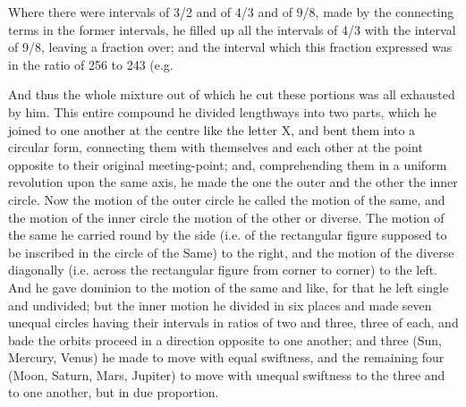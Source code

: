 \documentclass[11pt,letter]{article}
\begin{document}
\par  Where there were intervals of 3/2 and of 4/3 and of 9/8, made by the connecting terms in the former intervals, he filled up all the intervals of 4/3 with the interval of 9/8, leaving a fraction over; and the interval which this fraction expressed was in the ratio of 256 to 243 (e.g.
 
\par  And thus the whole mixture out of which he cut these portions was all exhausted by him. This entire compound he divided lengthways into two parts, which he joined to one another at the centre like the letter X, and bent them into a circular form, connecting them with themselves and each other at the point opposite to their original meeting-point; and, comprehending them in a uniform revolution upon the same axis, he made the one the outer and the other the inner circle. Now the motion of the outer circle he called the motion of the same, and the motion of the inner circle the motion of the other or diverse. The motion of the same he carried round by the side (i.e. of the rectangular figure supposed to be inscribed in the circle of the Same) to the right, and the motion of the diverse diagonally (i.e. across the rectangular figure from corner to corner) to the left. And he gave dominion to the motion of the same and like, for that he left single and undivided; but the inner motion he divided in six places and made seven unequal circles having their intervals in ratios of two and three, three of each, and bade the orbits proceed in a direction opposite to one another; and three (Sun, Mercury, Venus) he made to move with equal swiftness, and the remaining four (Moon, Saturn, Mars, Jupiter) to move with unequal swiftness to the three and to one another, but in due proportion.
\end{document}
